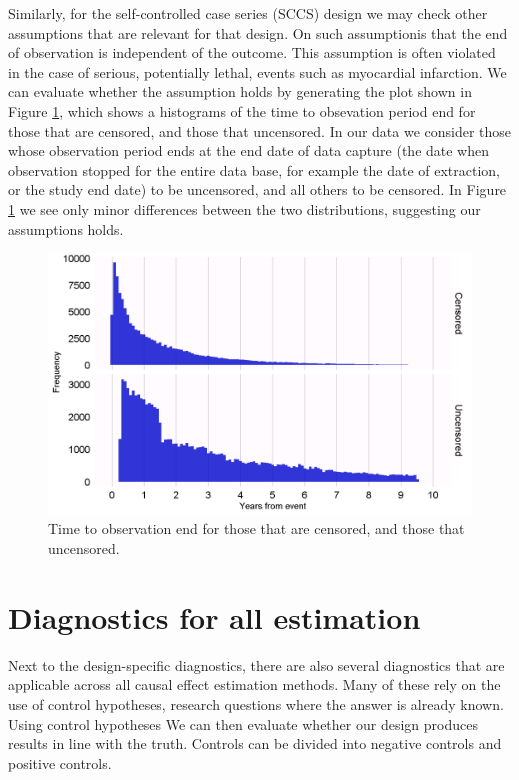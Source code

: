 \documentclass[11pt]{book}
\begin{document}
Similarly, for the self-controlled case series (SCCS) design we may
check other assumptions that are relevant for that design. On such
assumptionis that the end of observation is independent of the outcome.
This assumption is often violated in the case of serious, potentially
lethal, events such as myocardial infarction. We can evaluate whether
the assumption holds by generating the plot shown in Figure
\ref{fig:timeToObsEnd}, which shows a histograms of the time to
obsevation period end for those that are censored, and those that
uncensored. In our data we consider those whose observation period ends
at the end date of data capture (the date when observation stopped for
the entire data base, for example the date of extraction, or the study
end date) to be uncensored, and all others to be censored. In Figure
\ref{fig:timeToObsEnd} we see only minor differences between the two
distributions, suggesting our assumptions holds.

\begin{figure}

{\centering \includegraphics[width=1\linewidth]{images/MethodValidity/timeToObsEnd} 

}

\caption{Time to observation end for those that are censored, and those that uncensored.}\label{fig:timeToObsEnd}
\end{figure}

\section{Diagnostics for all
estimation}\label{diagnostics-for-all-estimation}

Next to the design-specific diagnostics, there are also several
diagnostics that are applicable across all causal effect estimation
methods. Many of these rely on the use of control hypotheses, research
questions where the answer is already known. Using control hypotheses We
can then evaluate whether our design produces results in line with the
truth. Controls can be divided into negative controls and positive
controls.
\end{document}
